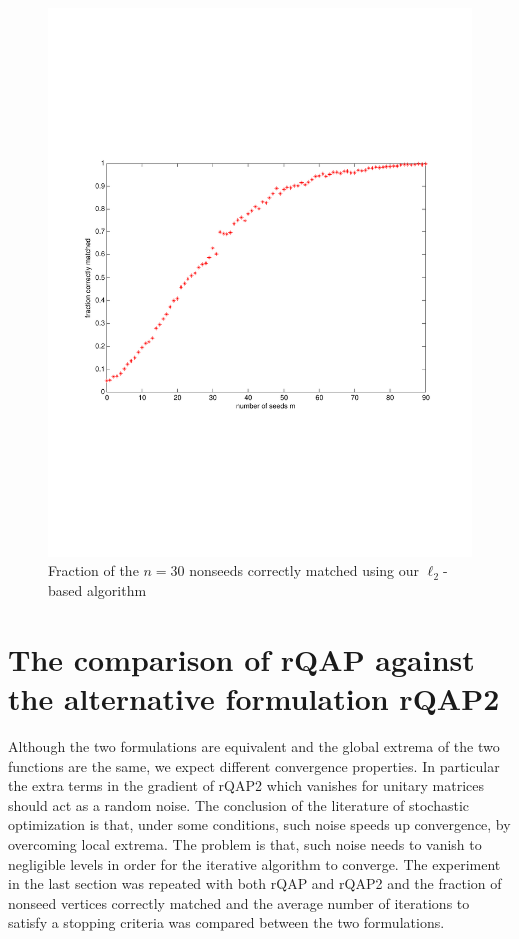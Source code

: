 \documentclass[12pt]{article}
\begin{document}
 \begin{figure}
 \centering
  \caption{Fraction of the $n=30$ nonseeds correctly matched using our $\ell_2$-based algorithm \label{figell2}}
 \includegraphics[width=1.2\textwidth]{n30rep65ell2}
\end{figure}


\section{The comparison of rQAP against the alternative formulation rQAP2}
Although the two formulations are equivalent and the global extrema of the two functions are the same, we expect different convergence  properties. In particular the extra terms in the gradient of rQAP2 which vanishes for unitary matrices should act as a random noise. The conclusion of the literature of stochastic optimization  is that, under some conditions, such noise speeds up convergence, by overcoming local extrema. The problem is that, such noise needs to vanish to negligible levels in order for the iterative algorithm to converge. 
The experiment in the last  section was repeated with both rQAP and rQAP2 and the fraction of nonseed vertices correctly matched and the average number of iterations to satisfy a stopping criteria was compared between the two formulations. 
\end{document}
